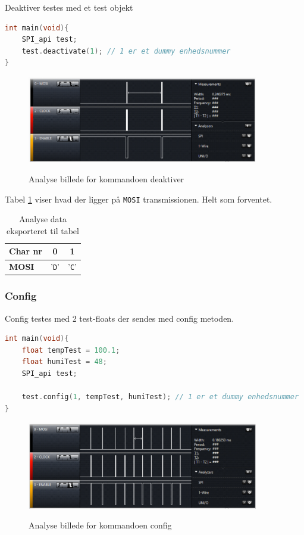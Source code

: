 Deaktiver testes med et test objekt

\begin{lstlisting}[language=C]
int main(void){
	SPI_api test;
	test.deactivate(1); // 1 er et dummy enhedsnummer
}
\end{lstlisting}

\begin{figure}[H]
\centering
{\includegraphics[width=0.90\textwidth]{filer/modultest/Billeder/mt_deactivate}}
\caption{Analyse billede for kommandoen deaktiver}
\label{lab:mt_deactivate}
\end{figure}

Tabel \ref{table:mt_deactivate} viser hvad der ligger på \verb+MOSI+ transmissionen. Helt som forventet.

\begin{table}[h]
	\caption{Analyse data eksporteret til tabel}
	\centering
	\begin{tabular}{|l|c|c|}
		\hline 
		\textbf{Char nr} & \textbf{0} & \textbf{1} \\ 		
		\hline 
		\textbf{MOSI} & '\verb+D+' & '\verb+C+' \\ 
		\hline 
	\end{tabular} 
	\label{table:mt_deactivate}
\end{table}


\subsubsection*{Config}
Config testes med 2 test-floats der sendes med config metoden.

\begin{lstlisting}[language=C]
int main(void){
	float tempTest = 100.1;
	float humiTest = 48;
	SPI_api test;
	
	test.config(1, tempTest, humiTest); // 1 er et dummy enhedsnummer
}
\end{lstlisting}

\begin{figure}[H]
\centering
{\includegraphics[width=0.90\textwidth]{filer/modultest/Billeder/mt_config}}
\caption{Analyse billede for kommandoen config}
\label{lab:mt_config}
\end{figure}

